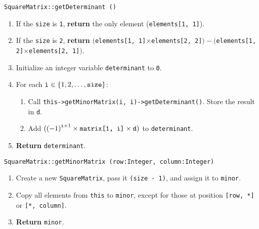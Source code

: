 \vspace{5mm}
{\tt SquareMatrix::getDeterminant ()}
\begin{enumerate}
	\item	If the {\tt size} is {\tt 1}, {\bf return} the only element ({\tt elements[1, 1]}).
	\item	If the {\tt size} is {\tt 2}, {\bf return}
			$(${\tt elements[1, 1]}$\times${\tt elements[2, 2]}$) - (${\tt elements[1, 2]}$\times${\tt elements[2, 1]}$)$.
	\item	Initialize an integer variable {\tt determinant} to {\tt 0}.
	\item	For each {\tt i} $\in \{1, 2, \dots, \text{\tt size}\}$:
		\begin{enumerate}
			\item	Call {\tt this->getMinorMatrix(i, i)->getDeterminant()}. Store the result in {\tt d}.
			\item	Add $({(-1)}^{\text{\tt i} + 1} \times \text{\tt matrix[1, i]} \times \text{\tt d})$ to
					{\tt determinant}.
		\end{enumerate}
	\item	{\bf Return} {\tt determinant}.
\end{enumerate}
\vspace{5mm}
{\tt SquareMatrix::getMinorMatrix (row:Integer, column:Integer)}
\begin{enumerate}
	\item	Create a new {\tt SquareMatrix}, pass it {\tt (size - 1)}, and assign it to {\tt minor}.
	\item	Copy all elements from {\tt this} to {\tt minor}, except for those at position {\tt[row, *]}
			or {\tt [*, column]}.
	\item	{\bf Return} {\tt minor}.
\end{enumerate}

\sourcecode





